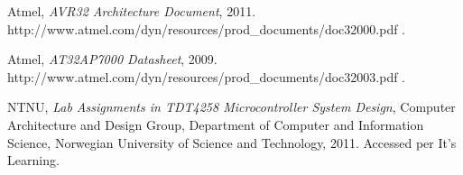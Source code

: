 
\begin{thebibliography}{9}
    Atmel, 
    \emph{AVR32 Architecture Document}, 2011. http://www.atmel.com/dyn/resources/prod\_documents/doc32000.pdf .

    Atmel, 
    \emph{AT32AP7000 Datasheet}, 2009. http://www.atmel.com/dyn/resources/prod\_documents/doc32003.pdf .

    NTNU,
    \emph{Lab Assignments in TDT4258 Microcontroller System Design},
    Computer Architecture and Design Group,
    Department of Computer and Information Science,
    Norwegian University of Science and Technology,
    2011. Accessed per It's Learning.
\end{thebibliography}

